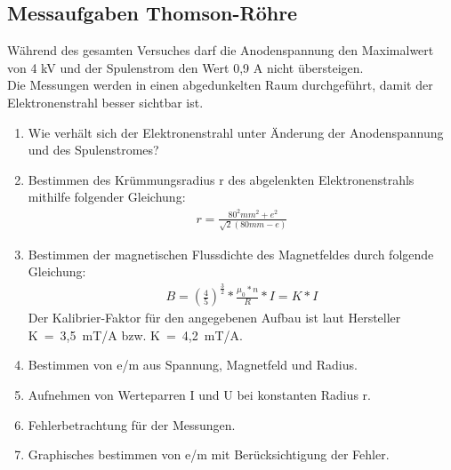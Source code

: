 \documentclass[a4paper,10pt]{scrartcl}
\begin{document}
	\subsection{Messaufgaben Thomson-Röhre}
	Während des gesamten Versuches darf die Anodenspannung den Maximalwert von 4 kV und der Spulenstrom den Wert 0,9 A nicht übersteigen. \\
	Die Messungen werden in einen abgedunkelten Raum durchgeführt, damit der Elektronenstrahl besser sichtbar ist.
	\begin{enumerate}
\item Wie verhält sich der Elektronenstrahl unter Änderung der Anodenspannung und des Spulenstromes?
\item Bestimmen des Krümmungsradius r des abgelenkten Elektronenstrahls mithilfe folgender Gleichung:
\begin{align*}
r=\frac{80^2mm^2+e^2}{\sqrt{2}(80mm-e)}
\end{align*}
\item Bestimmen der magnetischen Flussdichte des Magnetfeldes durch folgende Gleichung:
\begin{align*}
B=(\frac{4}{5})^{\frac{3}{2}}*\frac{{\mu}_0*n}{R}*I=K*I
\end{align*}
Der Kalibrier-Faktor für den angegebenen Aufbau ist laut Hersteller K~=~3,5~mT/A bzw.
K~=~4,2~mT/A.
\item Bestimmen von e/m aus Spannung, Magnetfeld und Radius.
\item Aufnehmen von Werteparren I und U bei konstanten Radius r.
\item Fehlerbetrachtung für der Messungen.
\item Graphisches bestimmen von e/m mit Berücksichtigung der Fehler.
\end{enumerate}
	
\end{document}
